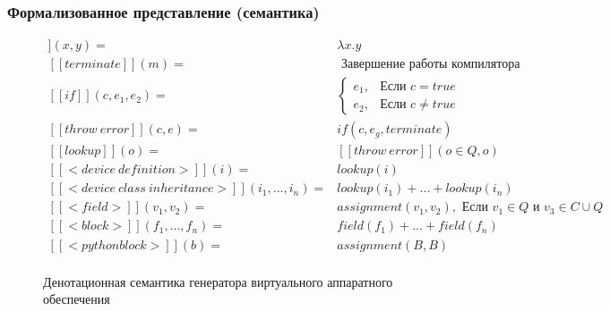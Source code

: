 \begin{frame}%
    \frametitle{Формализованное представление (семантика)}
    \begin{figure}[!htbp]
        \begin{adjustbox}{max totalsize={\textwidth}{\textheight}}
        \begin{minipage}{\linewidth}
                \centering
                \begingroup
                \begin{align*}
                    [[assignment]](x,y) ={}& \lambda x.y \\
                    [[terminate]](m) ={}& \text{ Завершение работы компилятора} \\
                    [[if]](c,e_1,e_2) ={}&
                    \begin{cases}
                        e_1, & \text{Если } c = true \\
                        e_2, & \text{Если } c \not= true
                    \end{cases} \\
                    [[throw\ error]](c, e) ={}& if(c, e_g, terminate) \\
                    [[lookup]](o) ={}& [[throw\ error]](o \in Q, o) \\
                    [[<device\ definition>]](i) ={}& lookup(i) \\
                    [[<device\ class\ inheritance>]](i_1,...,i_n) ={}& lookup(i_1) + ... + lookup(i_n) \\
                    [[<field>]](v_1, v_2) ={}& assignment(v_1, v_2), \text{ Если } v_1 \in Q \text{ и } v_3 \in C \cup Q \\
                    [[<block>]](f_1,...,f_n) ={}& field(f_1) + ... + field(f_n) \\
                    [[<python block>]](b) ={}& assignment(B,B)\\
                \end{align*}
                \endgroup
            \end{minipage}
        \end{adjustbox}
        \caption{Денотационная семантика генератора виртуального аппаратного обеспечения}
    \end{figure}
\end{frame}%


